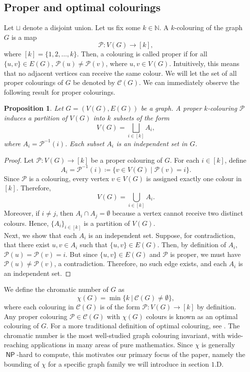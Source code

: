 \documentclass[12pt]{amsart}
\newcommand{\afunc}[1]{\operatorname{\mathsf{#1}}}
\numberwithin{figure}{section}
\theoremstyle{plain}
\newtheorem{proposition}[theorem]{Proposition}
\begin{document}
\subsection{Proper and optimal colourings} Let $\sqcup$ denote a disjoint union. Let us fix some $k\in\mathbb{N}$. A $k$-colouring of the graph $G$ is a map
\[\mathcal{P}:V(G) \to [k],\]
where $[k] = \{1,2,\dots,k\}$. Then, a colouring is called proper if for all $\{u,v\}\in E(G)$, $\mathcal{P}(u) \neq \mathcal{P}(v)$, where $u,v\in V(G)$. Intuitively, this means that no adjacent vertices can receive the same colour. We will let the set of all proper colourings of $G$ be denoted by $\mathscr{C}(G)$. We can immediately observe the following result for proper colourings.
\begin{proposition}
    Let $G = (V(G), E(G))$ be a graph. A proper $k$-colouring $\mathcal{P}$ induces a partition of $V(G)$ into $k$ subsets of the form
    \[V(G) = \bigsqcup_{i\in[k]}A_{i},\]
    where $A_{i} = \mathcal{P}^{-1}(i)$. Each subset $A_{i}$ is an independent set in $G$.
\end{proposition}
\begin{proof}
    Let $\mathcal{P}: V(G) \to [k]$ be a proper colouring of $G$. For each $i \in [k]$, define
    \[A_{i} = \mathcal{P}^{-1}(i) \coloneq \{ v \in V(G) \mid \mathcal{P}(v) = i \}.\]
    Since $\mathcal{P}$ is a colouring, every vertex $v \in V(G)$ is assigned exactly one colour in $[k]$. Therefore,
    \[V(G) = \bigcup_{i \in [k]} A_i.\]
    Moreover, if $i \neq j$, then $A_i \cap A_j = \emptyset$ because a vertex cannot receive two distinct colours. Hence, $\{A_i\}_{i \in [k]}$ is a partition of $V(G)$.\\
    \indent Next, we show that each $A_{i}$ is an independent set. Suppose, for contradiction, that there exist $u,v \in A_{i}$ such that $\{u,v\} \in E(G)$. Then, by definition of $A_{i}$, $\mathcal{P}(u) = \mathcal{P}(v) = i$. But since $\{u,v\} \in E(G)$ and $\mathcal{P}$ is proper, we must have $\mathcal{P}(u) \neq \mathcal{P}(v)$, a contradiction. Therefore, no such edge exists, and each $A_{i}$ is an independent set.
\end{proof}
\indent We define the chromatic number of $G$ as
\[\chi(G) = \min\{k\:|\:\mathscr{C}(G)\neq\emptyset\},\]
where each colouring in $\mathscr{C}(G)$ is of the form $\mathcal{P}:V(G) \to [k]$ by definition. Any proper colouring $\mathcal{P}\in\mathscr{C}(G)$ with $\chi(G)$ colours is known as an optimal colouring of $G$. For a more traditional definition of optimal colouring, see \cite{West01}. The chromatic number is the most well-studied graph colouring invariant, with wide-reaching applications in many areas of pure mathematics. Since $\chi$ is generally $\afunc{NP}$-hard to compute, this motivates our primary focus of the paper, namely the bounding of $\chi$ for a specific graph family we will introduce in section $1$.D.\\
\end{document}
